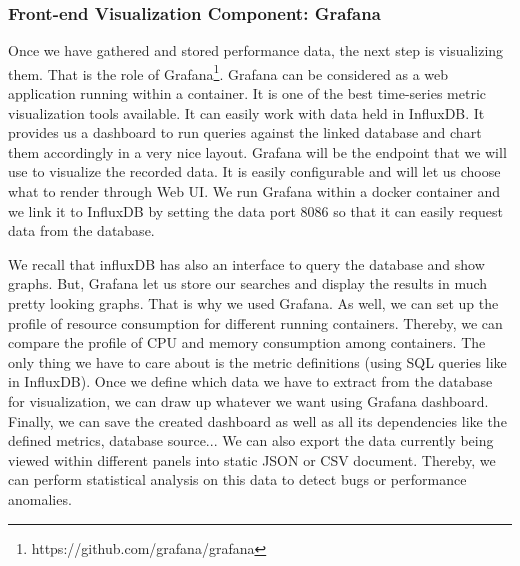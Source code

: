 \subsubsection{Front-end Visualization Component: Grafana}
Once we have gathered and stored performance data, the next step is visualizing them. That is the role of Grafana\footnote{https://github.com/grafana/grafana}. Grafana can be considered as a web application running within a container. It is one of the best time-series metric visualization tools available. It can easily work with data held in InfluxDB. It provides us a dashboard to run queries against the linked database and chart them accordingly in a very nice layout. Grafana will be the endpoint that we will use to visualize the recorded data. It is easily configurable and will let us choose what to render through Web UI. We run Grafana within a docker container and we link it to InfluxDB by setting the data port 8086 so that it can easily request data from the database.

We recall that influxDB has also an interface to query the database and show graphs. But, Grafana let us store our searches and display the results in much pretty looking graphs. That is why we used Grafana.
As well, we can set up the profile of resource consumption for different running
containers. Thereby, we can compare the profile of CPU and memory consumption among containers. The only thing we have to care about is the metric definitions (using SQL queries like in InfluxDB). Once we define which data we have to extract from the database for visualization, we can draw up whatever we want using Grafana dashboard. Finally, we can save the created dashboard as well as all its dependencies like the defined metrics, database source... We can also export the data currently being viewed within different
panels into static JSON or CSV document. Thereby, we can perform statistical analysis on this data to detect bugs or performance anomalies.

